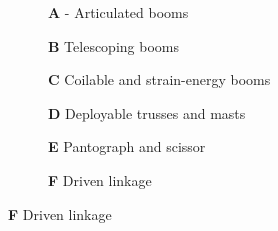 \newcommand{\famstub}{\fbox{\rule{0pt}{3.0cm}\rule{4.0cm}{0pt}}}

\begin{figure}[htbp]
    \centering

    \begin{subfigure}[t]{0.31\textwidth}
        \centering
        \famstub %
        \caption{\textbf{A} - Articulated booms \cite{bouwmeester_enabling_2023}}
        \label{fig:family-a}
    \end{subfigure}
    \hfill
    \begin{subfigure}[t]{0.31\textwidth}
        \centering
        \famstub %
        \caption{\textbf{B} Telescoping booms \cite{gooding_novel_2019}}
        \label{fig:family-b}
    \end{subfigure}
    \hfill
    \begin{subfigure}[t]{0.31\textwidth}
        \centering
        \famstub %
        \caption{\textbf{C} Coilable and strain-energy booms \cite{black_deployment_2006}}
        \label{fig:family-c}
    \end{subfigure}

    \vspace{0.8em}

    \begin{subfigure}[t]{0.31\textwidth}
        \centering
        \famstub %
        \caption{\textbf{D} Deployable trusses and masts \cite{kempenaers_deployable_2025}}
        \label{fig:family-d}
    \end{subfigure}
    \hfill
    \begin{subfigure}[t]{0.31\textwidth}
        \centering
        \famstub %
        \caption{\textbf{E} Pantograph and scissor \cite{nagy_design_2021}}
        \label{fig:family-e}
    \end{subfigure}
    \hfill
    \begin{subfigure}[t]{0.31\textwidth}
        \centering
        \famstub %
        \caption{\textbf{F} Driven linkage \cite{ni_four-bar_2019}}
        \label{fig:family-f}
    \end{subfigure}

    \vspace{0.8em}


\end{figure}
